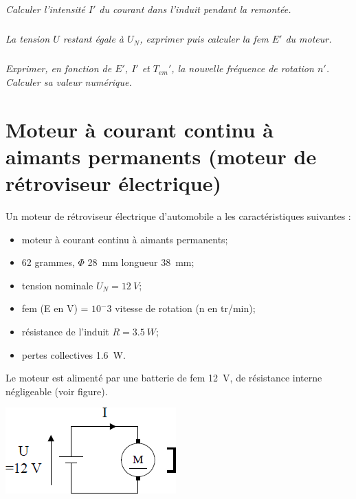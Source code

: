 \documentclass[10pt,fleqn]{article} %
\begin{document}
\begin{multicols}{2}
\begin{multicols}{2}
\subparagraph{}\textit{Calculer l'intensité $I'$ du courant dans l'induit pendant la remontée. }
\ifprof
\begin{corrige}
\end{corrige}
\else
\fi


\subparagraph{}\textit{La tension $U$ restant égale à $U_N$, exprimer puis calculer la fem $E'$ du moteur. }
\ifprof
\begin{corrige}
\end{corrige}
\else
\fi


\subparagraph{}\textit{ Exprimer, en fonction de $E'$, $I'$ et $T_{em}'$, la nouvelle fréquence de rotation $n'$. Calculer sa
valeur numérique. }
\ifprof
\begin{corrige}
\end{corrige}
\else
\fi



\newpage

\section*{Moteur à courant continu à aimants permanents (moteur de
rétroviseur électrique)}

\setcounter{exo}{0}

Un moteur de rétroviseur électrique d’automobile a les caractéristiques suivantes :
\begin{itemize}
\item moteur à courant continu à aimants permanents;
\item 62 grammes, $\Phi$ \SI{28}{mm} longueur \SI{38}{mm};
\item tension nominale $U_N=\SI{12}{V}$;
\item fem (E en V) = $10^-3$ vitesse de rotation (n en tr/min);
\item résistance de l’induit $R=\SI{3,5}{W}$;
\item pertes collectives \SI{1,6}{W}.
\end{itemize}
Le moteur est alimenté par une batterie de fem \SI{12}{V}, de
résistance interne négligeable (voir figure).

\begin{center}
\includegraphics[width=.9\linewidth]{images/fig_01}
\end{center}


\end{multicols}
\end{multicols}
\end{document}
